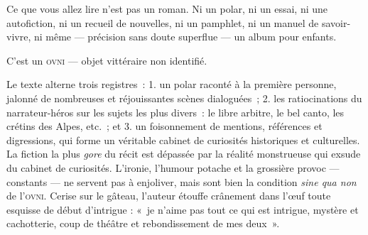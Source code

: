 Ce que vous allez lire n'est pas un roman. Ni un polar, ni un essai,
ni une autofiction, ni un recueil de nouvelles, ni un pamphlet, ni un manuel
de savoir-vivre, ni même — précision sans doute superflue — un album pour enfants.

C'est un \textsc{ovni} — objet vittéraire non identifié.

Le texte alterne trois registres~: 1. un polar raconté à la première personne,
jalonné de nombreuses et réjouissantes scènes dialoguées~; 2. les ratiocinations du
narrateur-héros sur les sujets les plus divers~: le libre arbitre, le bel
canto, les crétins des Alpes, etc.~; et 3. un foisonnement de mentions,
références et digressions, qui forme un véritable cabinet de curiosités
historiques et culturelles. La fiction la plus \textit{gore} du récit est
dépassée par la réalité monstrueuse qui exsude du cabinet de curiosités.
L'ironie, l'humour potache et la grossière provoc — constants — ne servent
pas à enjoliver, mais sont bien la condition \textit{sine qua non} de l'\textsc{ovni}. Cerise sur le gâteau, l’auteur étouffe crânement dans l’œuf toute esquisse de début d’intrigue : «~je n’aime pas tout ce qui est intrigue, mystère et cachotterie, coup de théâtre et rebondissement de mes deux~».
